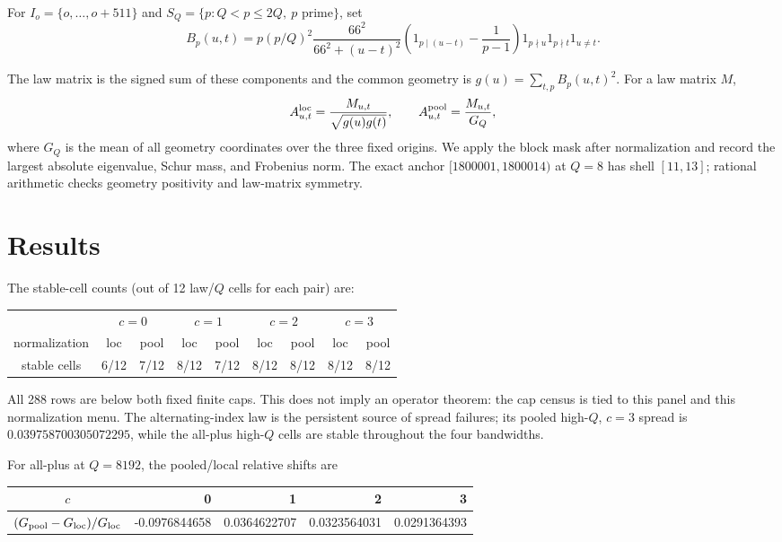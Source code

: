 \documentclass[10pt]{article}
\begin{document}
For \(I_o=\{o,\ldots,o+511\}\) and
\(S_Q=\{p:Q<p\leq2Q,\ p\text{ prime}\}\), set
\[
B_p(u,t)=p(p/Q)^2\frac{66^2}{66^2+(u-t)^2}
\left(1_{p\mid(u-t)}-\frac1{p-1}\right)
1_{p\nmid u}1_{p\nmid t}1_{u\ne t}.
\]

The law matrix is the signed sum of these components and the common geometry
is \(g(u)=\sum_{t,p}B_p(u,t)^2\).  For a law matrix \(M\),
\[
A^{\rm loc}_{u,t}=\frac{M_{u,t}}{\sqrt{g(u)g(t)}},\qquad
A^{\rm pool}_{u,t}=\frac{M_{u,t}}{G_Q},
\]
where \(G_Q\) is the mean of all geometry coordinates over the three fixed
origins.  We apply the block mask after normalization and record the largest
absolute eigenvalue, Schur mass, and Frobenius norm.  The exact anchor
\([1800001,1800014)\) at \(Q=8\) has shell \([11,13]\); rational arithmetic
checks geometry positivity and law-matrix symmetry.

\section{Results}

The stable-cell counts (out of 12 law/\(Q\) cells for each pair) are:

\begin{center}
\small
\begin{tabular}{c|cc|cc|cc|cc}
\toprule
 & \multicolumn{2}{c|}{\(c=0\)} & \multicolumn{2}{c|}{\(c=1\)} &
   \multicolumn{2}{c|}{\(c=2\)} & \multicolumn{2}{c}{\(c=3\)}\\
normalization & loc & pool & loc & pool & loc & pool & loc & pool\\
\midrule
stable cells & 6/12 & 7/12 & 8/12 & 7/12 & 8/12 & 8/12 & 8/12 & 8/12\\
\bottomrule
\end{tabular}
\end{center}

All 288 rows are below both fixed finite caps.  This does not imply an
operator theorem: the cap census is tied to this panel and this normalization
menu.  The alternating-index law is the persistent source of spread failures;
its pooled high-\(Q\), \(c=3\) spread is \(0.039758700305072295\), while the
all-plus high-\(Q\) cells are stable throughout the four bandwidths.

For all-plus at \(Q=8192\), the pooled/local relative shifts are
\begin{center}
\small
\begin{tabular}{c|rrrr}
\toprule
\(c\) & 0 & 1 & 2 & 3\\
\midrule
\((G_{\rm pool}-G_{\rm loc})/G_{\rm loc}\)
 & -0.0976844658 & 0.0364622707 & 0.0323564031 & 0.0291364393\\
\bottomrule
\end{tabular}
\end{center}
\end{document}
